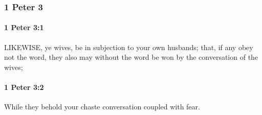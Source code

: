 	\subsubsection{1 Peter 3} %
		\label{1PETER-3}
		
		\paragraph{1 Peter 3:1} %
			\label{1PETER-3-1}

			LIKEWISE, ye wives, be in subjection to your own husbands; that, if any obey not the word, they also may without the word be won by the conversation of the wives;

			\begin{framed}
			\scriptsize
				\begin{compactdesc}
					\item[SBLG] 
				\end{compactdesc}
			\end{framed}

		\paragraph{1 Peter 3:2} %
			\label{1PETER-3-2}

			While they behold your chaste conversation coupled with fear.


